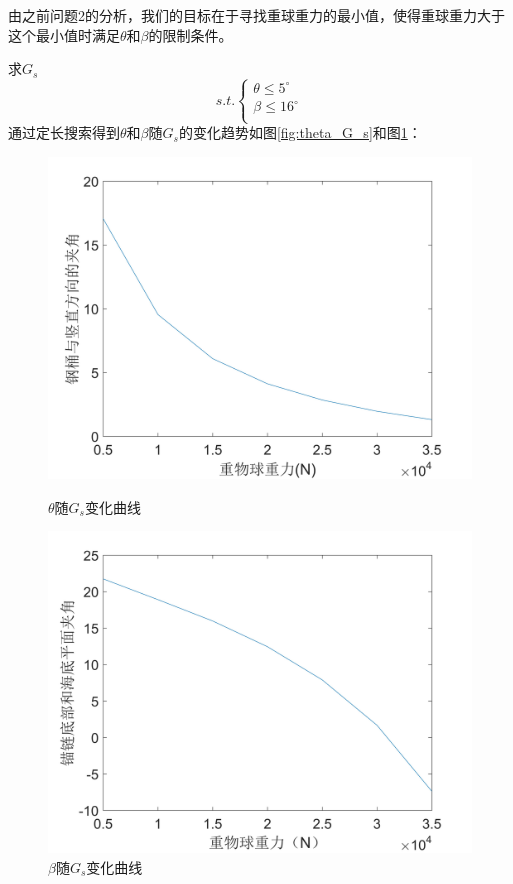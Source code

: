 \documentclass{cumcm}
\begin{document}
由之前问题2的分析，我们的目标在于寻找重球重力的最小值，使得重球重力大于这个最小值时满足$\theta$和$\beta$的限制条件。\par
求$G_s$
\begin{displaymath}
	s.t.\left\{
	\begin{aligned}
	\theta\le 5^\circ\\
	\beta \le 16^\circ\\
	\end{aligned}
	\right.
\end{displaymath}
通过定长搜索得到$\theta$和$\beta$随$G_s$的变化趋势如图\ref{fig:theta_G_s}和图\ref{fig:beta_G_s}：
\begin{figure}[H]
  \begin{minipage}[t]{0.5\linewidth}   
    \centering
    \includegraphics[width=\textwidth]{img/theta_G_s.jpg}   
    \caption{$\theta$随$G_s$变化曲线}   
    \label{fig:theta_G_s}   
  \end{minipage}
   \begin{minipage}[t]{0.5\linewidth} %
      \centering   
      \includegraphics[width=\textwidth]{img/beta_G_s.jpg}   
      \caption{$\beta$随$G_s$变化曲线}   
      \label{fig:beta_G_s}   
    \end{minipage} 
\end{figure}
\end{document}
